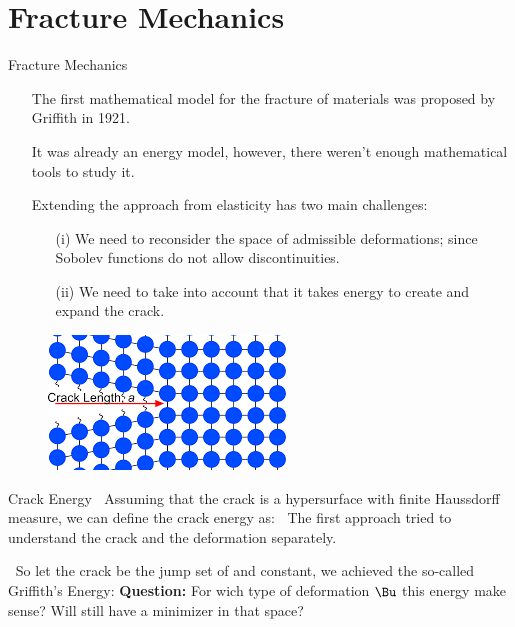 \documentclass{beamer}
\newcommand{\bul}{{\color{structure}\textbullet}}
\begin{document}
\section{Fracture Mechanics}
\begin{frame}{Fracture Mechanics}
    \begin{itemize}
        \item[\bul] The first mathematical model for the fracture of materials was proposed by Griffith in 1921.\vfill
        \item[\bul] It was already an energy model, however, there weren't enough mathematical tools to study it.
         \vfill   
        \item[\bul] Extending the approach from elasticity  has two main challenges:
        \pause
        \begin{itemize}
            \item[(i)]  We need to reconsider the space of admissible deformations; since Sobolev functions do not allow discontinuities.\pause
            \item[(ii)] We need to take into account that it takes energy to create and expand the crack.
        \end{itemize}
    \end{itemize}
    \begin{figure}
        \includegraphics{figures/crack2.png}
    \end{figure}
\end{frame}
\begin{frame}{Crack Energy}
\bul $\ $ Assuming that the crack is a hypersurface \vl{$\Gamma$} with finite  Haussdorff measure, we can define the crack energy as: 
\vfill
\bul $\ $ The first approach tried to understand the crack and the deformation \vl{$\Bu$} separately.
\vfill\pause

\bul $\ $ So let the crack be the jump set  of \vl{$\Bu$} and  constant, we achieved the so-called Griffith's Energy:
\vfill\pause
\textbf{Question:} For wich type of deformation $\Bu$ this energy make sense? Will still have a minimizer in that space?
\end{frame}
\end{document}
